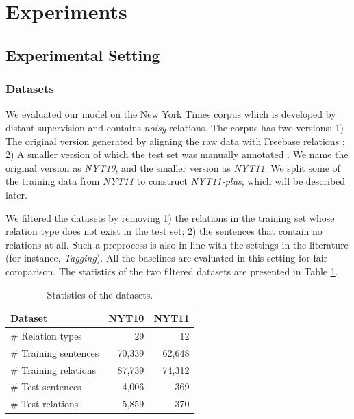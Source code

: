 \documentclass[letterpaper]{article}
\theoremstyle{definition}
\begin{document}
\section{Experiments}

\subsection{Experimental Setting}
\subsubsection{Datasets}
We evaluated our model on the New York Times corpus which is developed by distant supervision and contains \textit{noisy} relations. The corpus has two versions: 1) The original version generated by aligning the raw data with Freebase relations \cite{riedel2010modeling}; 2) A smaller version of which the test set was manually annotated \cite{hoffmann2011knowledge}. We name the original version as {\it NYT10}, and the smaller version as {\it NYT11}. We split some of the training data from \textit{NYT11} to construct \textit{NYT11-plus}, which will be described later.



We filtered the datasets by removing 1) the relations in the training set whose relation type does not exist in the test set; 2) the sentences that contain no relations at all. Such a preprocess is also in line with the settings in the literature (for instance, \textit{Tagging}). All the baselines are evaluated in this setting for fair comparison. The statistics of the two filtered datasets are presented in Table \ref{datasets}.

\begin{table}[!htb]
    \centering
    \begin{tabular}{lrr}%
    \toprule
        Dataset & NYT10 & NYT11 \\%
    \midrule
        \# Relation types & 29 & 12 \\%
        \# Training sentences & 70,339 & 62,648 \\%
        \# Training relations & 87,739 & 74,312 \\%
        \# Test sentences & 4,006 & 369 \\%
        \# Test relations & 5,859 & 370 \\%
    \bottomrule
    \end{tabular}
    \caption{Statistics of the datasets.}
    \label{datasets}
\end{table}
\end{document}
